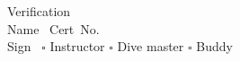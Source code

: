 \documentclass[a5paper,14pt]{extarticle}
\begin{document}
{  \vspace{4em}
  \noindent
  \phantom{}\hrulefill\\
  \phantom{}\hrulefill\\
  \phantom{}\hrulefill\\
  \phantom{}\hrulefill\\
  \phantom{}\hrulefill\\\vspace{-3em}
  \begin{tcolorbox}
    {\vspace{-.5em}\footnotesize \textcolor{grayedcaption}{Verification}}\vspace{-1em}\\
    Name \hrulefill\ Cert~No.~\hrulefill\\
    Sign \hrulefill~$\square$ Instructor $\square$ Dive master $\square$ Buddy
  \end{tcolorbox}
  \clearpage
}
\end{document}
